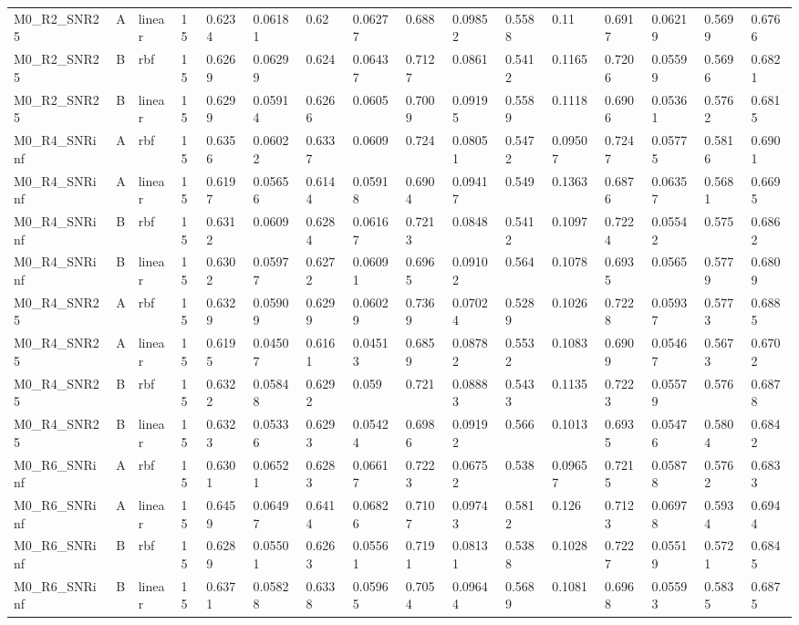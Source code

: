 \begin{tabular}{llllllllllllllll}
M0\_R2\_SNR25 & A & linear & 15 & 0.6234 & 0.06181 & 0.62 & 0.06277 & 0.688 & 0.09852 & 0.5588 & 0.11 & 0.6917 & 0.06219 & 0.5699 & 0.6766 \\
M0\_R2\_SNR25 & B & rbf & 15 & 0.6269 & 0.06299 & 0.624 & 0.06437 & 0.7127 & 0.0861 & 0.5412 & 0.1165 & 0.7206 & 0.05599 & 0.5696 & 0.6821 \\
M0\_R2\_SNR25 & B & linear & 15 & 0.6299 & 0.05914 & 0.6266 & 0.0605 & 0.7009 & 0.09195 & 0.5589 & 0.1118 & 0.6906 & 0.05361 & 0.5762 & 0.6815 \\
M0\_R4\_SNRinf & A & rbf & 15 & 0.6356 & 0.06022 & 0.6337 & 0.0609 & 0.724 & 0.08051 & 0.5472 & 0.09507 & 0.7247 & 0.05775 & 0.5816 & 0.6901 \\
M0\_R4\_SNRinf & A & linear & 15 & 0.6197 & 0.05656 & 0.6144 & 0.05918 & 0.6904 & 0.09417 & 0.549 & 0.1363 & 0.6876 & 0.06357 & 0.5681 & 0.6695 \\
M0\_R4\_SNRinf & B & rbf & 15 & 0.6312 & 0.0609 & 0.6284 & 0.06167 & 0.7213 & 0.0848 & 0.5412 & 0.1097 & 0.7224 & 0.05542 & 0.575 & 0.6862 \\
M0\_R4\_SNRinf & B & linear & 15 & 0.6302 & 0.05977 & 0.6272 & 0.06091 & 0.6965 & 0.09102 & 0.564 & 0.1078 & 0.6935 & 0.0565 & 0.5779 & 0.6809 \\
M0\_R4\_SNR25 & A & rbf & 15 & 0.6329 & 0.05909 & 0.6299 & 0.06029 & 0.7369 & 0.07024 & 0.5289 & 0.1026 & 0.7228 & 0.05937 & 0.5773 & 0.6885 \\
M0\_R4\_SNR25 & A & linear & 15 & 0.6195 & 0.04507 & 0.6161 & 0.04513 & 0.6859 & 0.08782 & 0.5532 & 0.1083 & 0.6909 & 0.05467 & 0.5673 & 0.6702 \\
M0\_R4\_SNR25 & B & rbf & 15 & 0.6322 & 0.05848 & 0.6292 & 0.059 & 0.721 & 0.08883 & 0.5433 & 0.1135 & 0.7223 & 0.05579 & 0.576 & 0.6878 \\
M0\_R4\_SNR25 & B & linear & 15 & 0.6323 & 0.05336 & 0.6293 & 0.05424 & 0.6986 & 0.09192 & 0.566 & 0.1013 & 0.6935 & 0.05476 & 0.5804 & 0.6842 \\
M0\_R6\_SNRinf & A & rbf & 15 & 0.6301 & 0.06521 & 0.6283 & 0.06617 & 0.7223 & 0.06752 & 0.538 & 0.09657 & 0.7215 & 0.05878 & 0.5762 & 0.6833 \\
M0\_R6\_SNRinf & A & linear & 15 & 0.6459 & 0.06497 & 0.6414 & 0.06826 & 0.7107 & 0.09743 & 0.5812 & 0.126 & 0.7123 & 0.06978 & 0.5934 & 0.6944 \\
M0\_R6\_SNRinf & B & rbf & 15 & 0.6289 & 0.05501 & 0.6263 & 0.05561 & 0.7191 & 0.08131 & 0.5388 & 0.1028 & 0.7227 & 0.05519 & 0.5721 & 0.6845 \\
M0\_R6\_SNRinf & B & linear & 15 & 0.6371 & 0.05828 & 0.6338 & 0.05965 & 0.7054 & 0.09644 & 0.5689 & 0.1081 & 0.6968 & 0.05593 & 0.5835 & 0.6875 \\

\end{tabular}
